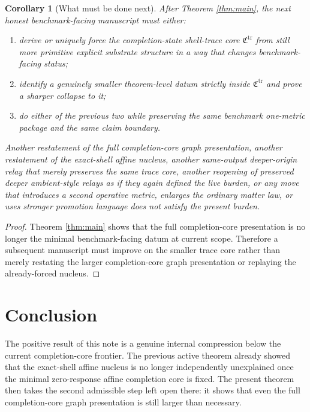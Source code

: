 \documentclass[11pt]{article}
\newcommand{\TraceCore}{\mathfrak C^{\mathrm{tr}}}
\newtheorem{corollary}{Corollary}
\begin{document}
\begin{corollary}[What must be done next]
\label{cor:next}
After Theorem \ref{thm:main}, the next honest benchmark-facing manuscript must either:
\begin{enumerate}
    \item derive or uniquely force the completion-state shell-trace core \(\TraceCore\) from still more primitive explicit substrate structure in a way that changes benchmark-facing status;
    \item identify a genuinely smaller theorem-level datum strictly inside \(\TraceCore\) and prove a sharper collapse to it;
    \item do either of the previous two while preserving the same benchmark one-metric package and the same claim boundary.
\end{enumerate}
Another restatement of the full completion-core graph presentation, another restatement of the exact-shell affine nucleus, another same-output deeper-origin relay that merely preserves the same trace core, another reopening of preserved deeper ambient-style relays as if they again defined the live burden, or any move that introduces a second operative metric, enlarges the ordinary matter law, or uses stronger promotion language does not satisfy the present burden.
\end{corollary}

\begin{proof}
Theorem \ref{thm:main} shows that the full completion-core presentation is no longer the minimal benchmark-facing datum at current scope. Therefore a subsequent manuscript must improve on the smaller trace core rather than merely restating the larger completion-core graph presentation or replaying the already-forced nucleus.
\end{proof}

\section{Conclusion}

The positive result of this note is a genuine internal compression below the current completion-core frontier. The previous active theorem already showed that the exact-shell affine nucleus is no longer independently unexplained once the minimal zero-response affine completion core is fixed. The present theorem then takes the second admissible step left open there: it shows that even the full completion-core graph presentation is still larger than necessary.
\end{document}
